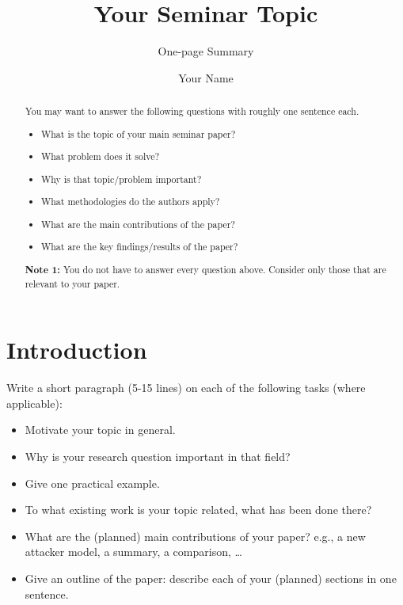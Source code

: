 \documentclass[sigconf]{acmart}
\begin{document}
\title{Your Seminar Topic}

\subtitle{One-page Summary}

\author{Your Name}

\renewcommand{\shortauthors}{Y. Name et al.}


\begin{abstract}
  You may want to answer the following questions with roughly one sentence each.

  \begin{itemize}
  \item What is the topic of your main seminar paper?
  \item What problem does it solve?
  \item Why is that topic/problem important?
  \item What methodologies do the authors apply?
  \item What are the main contributions of the paper?
  \item What are the key findings/results of the paper?
  \end{itemize}
  
  \textbf{Note 1:} You do not have to answer every question above. Consider only those that are relevant to your paper. 

\end{abstract}

\maketitle

\section{Introduction}

Write a short paragraph (5-15 lines) on each of the following tasks (where applicable):
\begin{itemize}
\item Motivate your topic in general.
\item Why is your research question important in that field?
\item Give one practical example.
\item To what existing work is your topic related, what has been done there?
\item What are the (planned) main contributions of your paper? e.g., a
new attacker model, a summary, a comparison, \dots
\item Give an outline of the paper: describe each of your (planned)
sections in one sentence.
\end{itemize}
\end{document}
